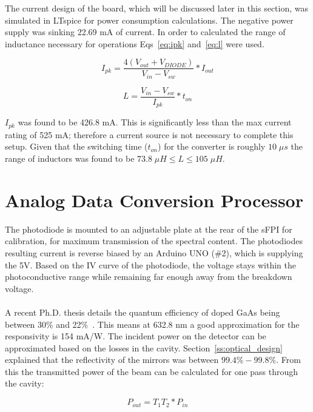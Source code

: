 \documentclass[12pt,journal]{IEEEtran}
\begin{document}
The current design of the board, which will be discussed later in this section, was simulated in LTspice for power consumption calculations. The negative power supply was sinking 22.69 mA of current. In order to calculated the range of inductance necessary for operations Eqs~\ref{eq:ipk} and~\ref{eq:l} were used. 

\begin{equation}
I_{pk} = \frac{4(V_{out} + V_{DIODE})}{V_{in} - V_{sw}}*I_{out}
\label{eq:ipk}
\end{equation}

\begin{equation}
L = \frac{V_{in} - V_{sw}}{I_{pk}}*t_{on}
\label{eq:l}
\end{equation}

$I_{pk}$ was found to be 426.8 mA. This is significantly less than the max current rating of 525 mA; therefore a current source is not necessary to complete this setup. Given that the switching time ($t_{on}$) for the converter is roughly $10\;\mu s$ the range of inductors was found to be $73.8\; \mu H \leq L \leq 105\; \mu H$.  

\section{Analog Data Conversion Processor}\label{processor}
The photodiode is mounted to an adjustable plate at the rear of the sFPI for calibration, for maximum transmission of the spectral content. The photodiodes resulting current is reverse biased by an Arduino UNO (\#2), which is supplying the 5V. Based on the IV curve of the photodiode, the voltage stays within the photoconductive range while remaining far enough away from the breakdown voltage. 
\\\\
A recent Ph.D. thesis details the quantum efficiency of doped GaAs being between 30\% and 22\%~\cite{responsivity}. This means at 632.8 nm a good approximation for the responsivity is 154 mA/W. The incident power on the detector can be approximated based on the losses in the cavity. Section~\ref{ss:optical_design} explained that the reflectivity of the mirrors was between $99.4\% - 99.8\%$. From this the transmitted power of the beam can be calculated for one pass through the cavity:

\begin{equation}
P_{out} = T_1T_2*P_{in}
\end{equation}
\end{document}
